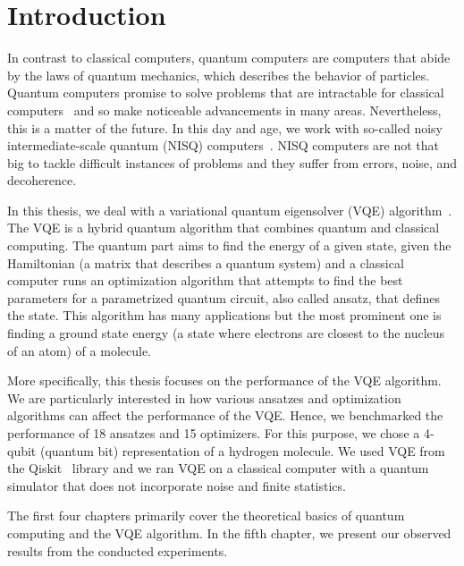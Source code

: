 \chapter*{Introduction}

In contrast to classical computers, quantum computers are computers that abide by the laws of quantum mechanics, which describes the behavior of particles. Quantum computers promise to solve problems that are intractable for classical computers~\cite{peruzzo} and so make noticeable advancements in many areas. Nevertheless, this is a matter of the future. In this day and age, we work with so-called noisy intermediate-scale quantum (NISQ) computers~\cite{nisq}. NISQ computers are not that big to tackle difficult instances of problems and they suffer from errors, noise, and decoherence.

In this thesis, we deal with a variational quantum eigensolver (VQE) algorithm~\cite{peruzzo,vqe_method}. The VQE is a hybrid quantum algorithm that combines quantum and classical computing. The quantum part aims to find the energy of a given state, given the Hamiltonian (a matrix that describes a quantum system) and a classical computer runs an optimization algorithm that attempts to find the best parameters for a parametrized quantum circuit, also called ansatz, that defines the state. This algorithm has many applications but the most prominent one is finding a ground state energy (a state where electrons are closest to the nucleus of an atom) of a molecule.

More specifically, this thesis focuses on the performance of the VQE algorithm. We are particularly interested in how various ansatzes and optimization algorithms can affect the performance of the VQE. Hence, we benchmarked the performance of 18 ansatzes and 15 optimizers. For this purpose, we chose a 4-qubit (quantum bit) representation of a hydrogen molecule. We used VQE from the Qiskit~\cite{qiskit} library and we ran VQE on a classical computer with a quantum simulator that does not incorporate noise and finite statistics.

The first four chapters primarily cover the theoretical basics of quantum computing and the VQE algorithm. In the fifth chapter, we present our observed results from the conducted experiments.